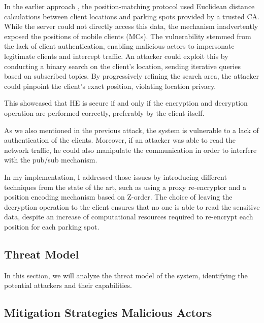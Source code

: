 In the earlier approach \cite{genova2024helamqtt}, the position-matching protocol used Euclidean distance calculations between client locations and parking spots provided by a trusted CA. While the server could not directly access this data, the mechanism inadvertently exposed the positions of mobile clients (MCs). The vulnerability stemmed from the lack of client authentication, enabling malicious actors to impersonate legitimate clients and intercept traffic. An attacker could exploit this by conducting a binary search on the client’s location, sending iterative queries based on subscribed topics. By progressively refining the search area, the attacker could pinpoint the client’s exact position, violating location privacy.

This showcased that HE is secure if and only if the encryption and decryption operation are performed correctly, preferably by the client itself.

As we also mentioned in the previous attack, the system is vulnerable to a lack of authentication of the clients. Moreover, if an attacker was able to read the network traffic, he could also manipulate the communication in order to interfere with the pub/sub mechanism.

In my implementation, I addressed those issues by introducing different techniques from the state of the art, such as using a proxy re-encryptor and a position encoding mechanism based on Z-order. The choice of leaving the decryption operation to the client ensures that no one is able to read the sensitive data, despite an increase of computational resources required to re-encrypt each position for each parking spot.

\subsection{Threat Model} \label{subsec:threatmodel}

In this section, we will analyze the threat model of the system, identifying the potential attackers and their capabilities. 


\subsection{Mitigation Strategies Malicious Actors}

